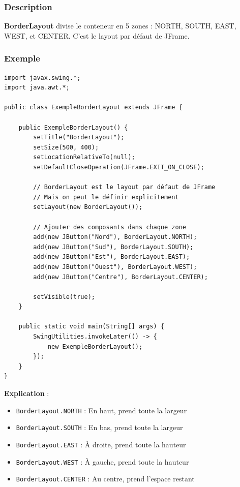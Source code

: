 \documentclass[11pt,a4paper]{article}
\begin{document}
\subsubsection{Description}

\textbf{BorderLayout} divise le conteneur en 5 zones : NORTH, SOUTH, EAST, WEST, et CENTER. C'est le layout par défaut de JFrame.

\subsubsection{Exemple}

\begin{lstlisting}
import javax.swing.*;
import java.awt.*;

public class ExempleBorderLayout extends JFrame {
    
    public ExempleBorderLayout() {
        setTitle("BorderLayout");
        setSize(500, 400);
        setLocationRelativeTo(null);
        setDefaultCloseOperation(JFrame.EXIT_ON_CLOSE);
        
        // BorderLayout est le layout par défaut de JFrame
        // Mais on peut le définir explicitement
        setLayout(new BorderLayout());
        
        // Ajouter des composants dans chaque zone
        add(new JButton("Nord"), BorderLayout.NORTH);
        add(new JButton("Sud"), BorderLayout.SOUTH);
        add(new JButton("Est"), BorderLayout.EAST);
        add(new JButton("Ouest"), BorderLayout.WEST);
        add(new JButton("Centre"), BorderLayout.CENTER);
        
        setVisible(true);
    }
    
    public static void main(String[] args) {
        SwingUtilities.invokeLater(() -> {
            new ExempleBorderLayout();
        });
    }
}
\end{lstlisting}

\textbf{Explication} :
\begin{itemize}
    \item \texttt{BorderLayout.NORTH} : En haut, prend toute la largeur
    \item \texttt{BorderLayout.SOUTH} : En bas, prend toute la largeur
    \item \texttt{BorderLayout.EAST} : À droite, prend toute la hauteur
    \item \texttt{BorderLayout.WEST} : À gauche, prend toute la hauteur
    \item \texttt{BorderLayout.CENTER} : Au centre, prend l'espace restant
\end{itemize}
\end{document}

